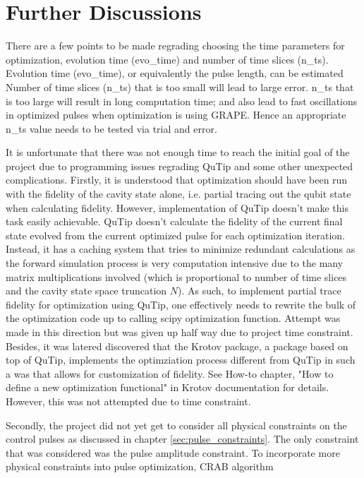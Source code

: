 \documentclass[12pt]{report}
\begin{document}
\section{Further Discussions}\label{sec:further_discussions}
There are a few points to be made regrading choosing the time parameters for optimization, evolution time (evo\_time) and number of time slices (n\_ts).
Evolution time (evo\_time), or equivalently the pulse length, can be estimated %
Number of time slices (n\_ts) that is too small will lead to large error. 
n\_ts that is too large will result in long computation time; and also lead to fast oscillations in optimized pulses when optimization is using GRAPE.
Hence an appropriate n\_ts value needs to be tested via trial and error.
\par
It is unfortunate that there was not enough time to reach the initial goal of the project due to programming issues regrading QuTip and some other unexpected complications.
Firstly, it is understood that optimization should have been run with the fidelity of the cavity state alone, i.e. partial tracing out the qubit state when calculating fidelity. 
However, implementation of QuTip doesn't make this task easily achievable. QuTip doesn't calculate the fidelity of the current final state evolved from the current optimized pulse for each optimization iteration. 
Instead, it has a caching system that tries to minimize redundant calculations as the forward simulation process is very computation intensive due to the many matrix multiplications involved (which is proportional to number of time slices and the cavity state space truncation $N$).
As such, to implement partial trace fidelity for optimization using QuTip, one effectively needs to rewrite the bulk of the optimization code up to calling scipy optimization function. 
Attempt was made in this direction but was given up half way due to project time constraint. 
Besides, it was latered discovered that the Krotov package, a package based on top of QuTip, implements the optimziation process different from QuTip in such a was that allows for customization of fidelity. 
See How-to chapter, "How to define a new optimization functional" in Krotov documentation for details.
However, this was not attempted due to time constraint.
\par
Secondly, the project did not yet get to consider all physical constraints on the control pulses as discussed in chapter \ref{sec:pulse_constraints}.
The only constraint that was considered was the pulse amplitude constraint. To incorporate more physical constraints into pulse optimization, CRAB algorithm 
\end{document}
